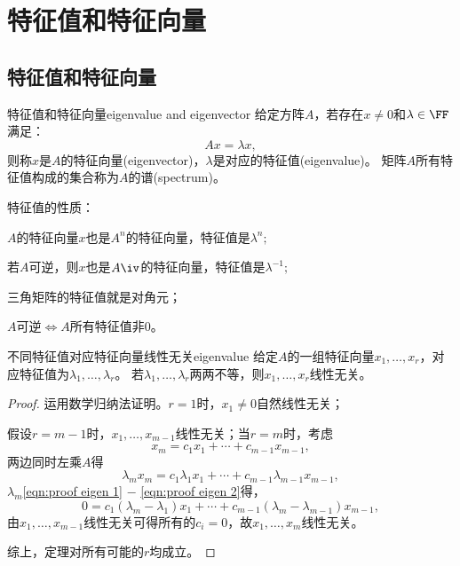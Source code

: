 
\chapter{特征值和特征向量}
\section{特征值和特征向量}
\begin{definition}{特征值和特征向量}{eigenvalue and eigenvector}
	给定方阵$A$，若存在$x\neq 0$和$\lambda\in\FF$满足：
	\[
		Ax=\lambda x,
	\]
	则称$x$是$A$的特征向量(eigenvector)，$\lambda$是对应的特征值(eigenvalue)。
	矩阵$A$所有特征值构成的集合称为$A$的谱(spectrum)。
\end{definition}

\begin{corollary}
	特征值的性质：
	\begin{compactenum}
		\item $A$的特征向量$x$也是$A^n$的特征向量，特征值是$\lambda^n;$
		\item 若$A$可逆，则$x$也是$A\iv$的特征向量，特征值是$\lambda^{-1};$
		\item 三角矩阵的特征值就是对角元；
		\item $A$可逆$\iff A$所有特征值非0。
		
	\end{compactenum}
\end{corollary}

\begin{theorem}{不同特征值对应特征向量线性无关}{eigenvalue}
	给定$A$的一组特征向量$x_1,\ldots,x_r$，对应特征值为$\lambda_1,\ldots,\lambda_r$。
	若$\lambda_1,\ldots,\lambda_r$两两不等，则$x_1,\ldots,x_r$线性无关。
\end{theorem}
\begin{proof}
	运用数学归纳法证明。$r=1$时，$x_1\neq 0$自然线性无关；
	
	假设$r=m-1$时，$x_1,\ldots,x_{m-1}$线性无关；当$r=m$时，考虑
	\begin{equation}
		\label{eqn:proof eigen 1}
		x_m=c_1x_1+\cdots+c_{m-1}x_{m-1},\tag{$\ast$}
	\end{equation}
	两边同时左乘$A$得
	\begin{equation}
		\label{eqn:proof eigen 2}
		\lambda_mx_m=c_1\lambda_1x_1+\cdots+c_{m-1}\lambda_{m-1}x_{m-1},\tag{$\ast\ast$}
	\end{equation}
	$\lambda_m$\eqref{eqn:proof eigen 1} $-$ \eqref{eqn:proof eigen 2}得，
	\[
		0=c_1(\lambda_m-\lambda_1)x_1+\cdots+c_{m-1}(\lambda_m-\lambda_{m-1})x_{m-1},
	\]
	由$x_1,\ldots,x_{m-1}$线性无关可得所有的$c_i=0$，故$x_1,\ldots,x_m$线性无关。

	综上，定理对所有可能的$r$均成立。
\end{proof}

